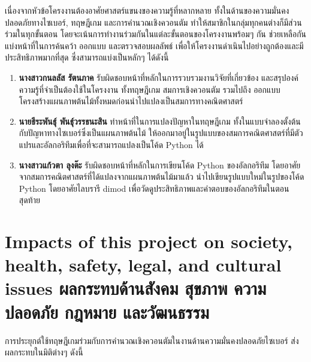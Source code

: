 เนื่องจากหัวข้อโครงงานต้องอาศัยศาสตร์แขนงของความรู้ที่หลากหลาย ทั้งในด้านของความมั่นคงปลอดภัยทางไซเบอร์, ทฤษฎีเกม และการคำนวณเชิงควอนตัม ทำให้สมาชิกในกลุ่มทุกคนต่างก็มีส่วนร่วมในทุกขั้นตอน โดยจะเน้นการทำงานร่วมกันในแต่ละขั้นตอนของโครงงานพร้อมๆ กัน ช่วยเหลือกันแบ่งหน้าที่ในการค้นคว้า ออกแบบ และตรวจสอบผลลัพธ์ เพื่อให้โครงงานดำเนินไปอย่างถูกต้องและมีประสิทธิภาพมากที่สุด ซึ่งสามารถแบ่งเป็นหลักๆ ได้ดังนี้
\begin{enumerate}
\item \textbf{นางสาวกนลลัส รัตนภาค} รับผิดชอบหน้าที่หลักในการรวบรวมงานวิจัยที่เกี่ยวข้อง และสรุปองค์ความรู้ที่จำเป็นต้องใช้ในโครงงาน ทั้งทฤษฎีเกม สมการเชิงควอนตัม รวมไปถึง ออกแบบโครงสร้างแผนภาพต้นไม้ทั้งหมดก่อนนำไปแปลงเป็นสมการทางคณิตศาสตร์
\item \textbf{นายธีระพันธุ์ พันธุ์วรรธนะสิน} ทำหน้าที่ในการแปลงปัญหาในทฤษฎีเกม ทั้งในแบบจำลองตั้งต้นกับปัญหาทางไซเบอร์ซึ่งเป็นแผนภาพต้นไม้ ให้ออกมาอยู่ในรูปแบบของสมการคณิตศาสตร์ที่มีตัวแปรและอัลกอริทึมเพื่อที่จะสามารถแปลงเป็นโค้ด Python ได้
\item \textbf{นางสาวแก้วตา ลุงต๊ะ} รับผิดชอบหน้าที่หลักในการเขียนโค้ด Python ของอัลกอริทึม โดยอาศัยจากสมการคณิตศาสตร์ที่ได้แปลงจากแผนภาพต้นไม้มาแล้ว นำไปเขียนรูปแบบใหม่ในรูปของโค้ด Python โดยอาศัยไลบรารี dimod เพื่อวัดดูประสิทธิภาพและคำตอบของอัลกอริทึมในตอนสุดท้าย
\end{enumerate}


\section{\ifenglish%
Impacts of this project on society, health, safety, legal, and cultural issues
\else%
ผลกระทบด้านสังคม สุขภาพ ความปลอดภัย กฎหมาย และวัฒนธรรม
\fi}

การประยุกต์ใช้ทฤษฎีเกมร่วมกับการคำนวณเชิงควอนตัมในงานด้านความมั่นคงปลอดภัยไซเบอร์ ส่งผลกระทบในมิติต่างๆ ดังนี้


